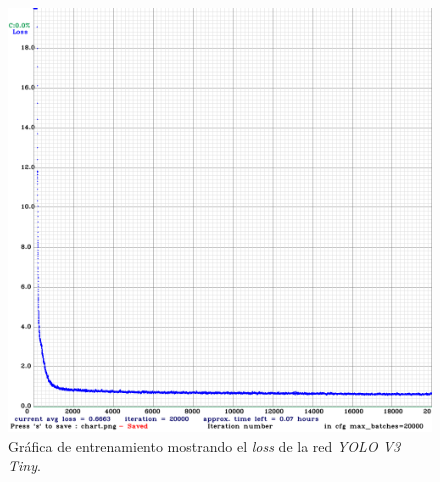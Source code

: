 \begin{figure} [h!]
	\begin{center}
		\includegraphics[width=12cm]{figs/chart}
	\end{center}
	\caption{Gráfica de entrenamiento mostrando el \textit{loss} de la red \textit{YOLO V3 Tiny}.}
	\label{fig:chart}
\end{figure}\

